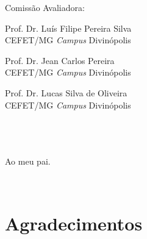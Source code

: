 \vspace*{2cm}

\noindent Comissão Avaliadora:
\vspace*{0.5cm}

\noindent \begin{minipage}{0.5\linewidth}
Prof. Dr. Luís Filipe Pereira Silva \\[1mm]
CEFET/MG {\em Campus} Divinópolis
\end{minipage}
\begin{minipage}{0.5\linewidth}
Prof. Dr. Jean Carlos Pereira \\[1mm]
CEFET/MG {\em Campus} Divinópolis
\end{minipage}

\vspace*{0.4cm}

\noindent \begin{minipage}{0.5\linewidth}
\noindent  Prof. Dr. Lucas Silva de Oliveira \\[1mm]
\noindent  CEFET/MG {\em Campus} Divinópolis
\end{minipage}

\null \vfill

\begin{center}
\cidade\\\ano
\end{center}

\thispagestyle{empty}
\newpage
\chapter*{}
\null
\vfill
\begin{flushright}
\begin{minipage}{6.5cm}
{\sc Ao meu pai.}
\end{minipage} \\[8mm]
\end{flushright}


\newpage
\chapter*{Agradecimentos}


